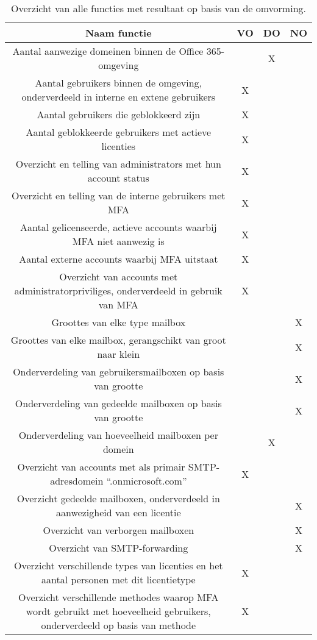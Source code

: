 \begin{table}[h]
    \centering
    \begin{adjustbox}{max width=\textwidth}
        \begin{tabular}{ |c||c|c|c| } 
            \hline
            \textbf{Naam functie} & \textbf{VO} & \textbf{DO} & \textbf{NO} \\
            \hline
            Aantal aanwezige domeinen binnen de Office 365-omgeving &  & X & \\
            Aantal gebruikers binnen de omgeving, onderverdeeld in interne en extene gebruikers & X &  & \\
            Aantal gebruikers die geblokkeerd zijn & X & & \\
            Aantal geblokkeerde gebruikers met actieve licenties & X & & \\
            Overzicht en telling van administrators met hun account status & X & & \\
            Overzicht en telling van de interne gebruikers met MFA & X & & \\
            Aantal gelicenseerde, actieve accounts waarbij MFA niet aanwezig is & X & & \\
            Aantal externe accounts waarbij MFA uitstaat & X & &  \\
            Overzicht van accounts met administratorpriviliges,
            onderverdeeld in gebruik van MFA & X & & \\
            Groottes van elke type mailbox & & & X \\
            Groottes van elke mailbox, gerangschikt van groot naar klein & & & X \\ 
            Onderverdeling van gebruikersmailboxen op basis van grootte & & & X \\ 
            Onderverdeling van gedeelde mailboxen op basis van grootte & & & X \\ 
            Onderverdeling van hoeveelheid mailboxen per domein & & X & \\ 
            Overzicht van accounts met als primair SMTP-adresdomein “.onmicrosoft.com” & X & & \\
            Overzicht gedeelde mailboxen, onderverdeeld in aanwezigheid van een licentie & & & X \\ 
            Overzicht van verborgen mailboxen & & & X \\ 
            Overzicht van SMTP-forwarding & & & X \\ 
            Overzicht verschillende types van licenties en het
            aantal personen met dit licentietype & X & & \\ 
            Overzicht verschillende methodes waarop MFA wordt gebruikt met hoeveelheid gebruikers, onderverdeeld op basis van methode & X & & \\ 
            \hline
        \end{tabular}
    \end{adjustbox}
    \caption[Overzicht resultaten functies]{Overzicht van alle functies met resultaat op basis van de omvorming.}
    \label{POC}
\end{table}

